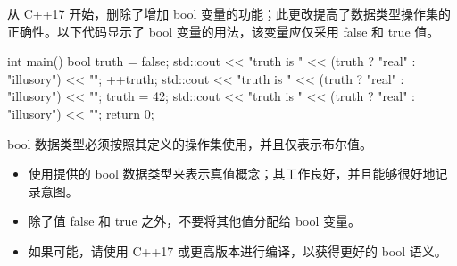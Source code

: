 从 C++17 开始，删除了增加 bool 变量的功能；此更改提高了数据类型操作集的正确性。以下代码显示了 bool 变量的用法，该变量应仅采用 false 和 true 值。


\begin{cpp}
int main() {
  bool truth = false;
  std::cout << "truth is " << (truth ? "real" : "illusory") << "\n";
  ++truth;
  std::cout << "truth is " << (truth ? "real" : "illusory") << "\n";
  truth = 42;
  std::cout << "truth is " << (truth ? "real" : "illusory") << "\n";
  return 0;
}
\end{cpp}

bool 数据类型必须按照其定义的操作集使用，并且仅表示布尔值。


\begin{itemize}
\item
使用提供的 bool 数据类型来表示真值概念；其工作良好，并且能够很好地记录意图。

\item
除了值 false 和 true 之外，不要将其他值分配给 bool 变量。

\item
如果可能，请使用 C++17 或更高版本进行编译，以获得更好的 bool 语义。
\end{itemize}

















